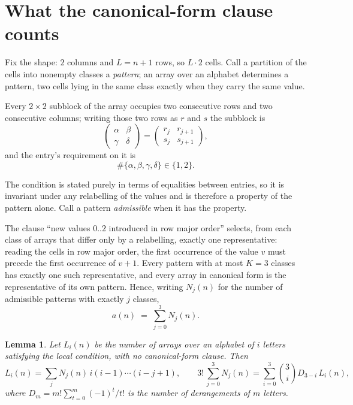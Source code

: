 \documentclass[11pt,a4paper]{article}
\theoremstyle{plain}
\newtheorem{lemma}[theorem]{Lemma}
\theoremstyle{definition}
\begin{document}
\section{What the canonical-form clause counts}

Fix the shape: $2$ columns and $L=n+1$ rows, so $L\cdot2$ cells. Call a
partition of the cells into nonempty classes a \emph{pattern}; an array over an alphabet
determines a pattern, two cells lying in the same class exactly when they carry the same
value.

Every $2\times2$ subblock of the array occupies two consecutive
rows and two consecutive columns; writing those two rows as $r$ and $s$ the
subblock is
\[
\begin{pmatrix}\alpha&\beta\\\gamma&\delta\end{pmatrix}=\begin{pmatrix}r_j&r_{j+1}\\s_j&s_{j+1}\end{pmatrix},
\]
and the entry's requirement on it is
\begin{equation}\label{eq:loc}
\#\{\alpha,\beta,\gamma,\delta\}\in\{1,2\}.
\end{equation}

The condition is stated purely in terms of equalities between entries, so it is invariant
under any relabelling of the values and is therefore a property of the pattern alone. Call a
pattern \emph{admissible} when it has the property.

The clause ``new values $0..2$ introduced in row major order'' selects, from each class
of arrays that differ only by a relabelling, exactly one representative: reading the cells in
row major order, the first occurrence of the value $v$ must precede the first occurrence of
$v+1$. Every pattern with at most $K=3$ classes has exactly one such representative, and
every array in canonical form is the representative of its own pattern. Hence, writing
$N_j(n)$ for the number of admissible patterns with exactly $j$ classes,
\begin{equation}\label{eq:apat}
a(n)\;=\;\sum_{j=0}^{3}N_j(n).
\end{equation}

\begin{lemma}\label{lem:inv}
Let $L_i(n)$ be the number of arrays over an alphabet of $i$ letters satisfying the local
condition, with no canonical-form clause. Then
\[
L_i(n)=\sum_j N_j(n)\,i(i-1)\cdots(i-j+1),
\qquad
3!\,\sum_{j=0}^{3}N_j(n)=\sum_{i=0}^{3}\binom{3}{i}D_{3-i}\,L_i(n),
\]
where $D_m=m!\sum_{t=0}^{m}(-1)^t/t!$ is the number of derangements of $m$ letters.
\end{lemma}
\end{document}
